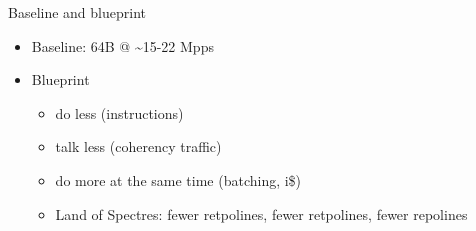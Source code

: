 \documentclass[aspectratio=169]{beamer}
\begin{document}
  \begin{frame}{Baseline and blueprint}
      \begin{itemize}
      \item Baseline: 64B @ \textasciitilde15-22 Mpps
      \item Blueprint
      \begin{itemize}
        \item do less (instructions)
        \item talk less (coherency traffic)
        \item do more at the same time (batching, i\$)
        \item Land of Spectres: fewer retpolines, fewer retpolines,
          fewer repolines
      \end{itemize}
      \end{itemize}
  \end{frame}
\end{document}
